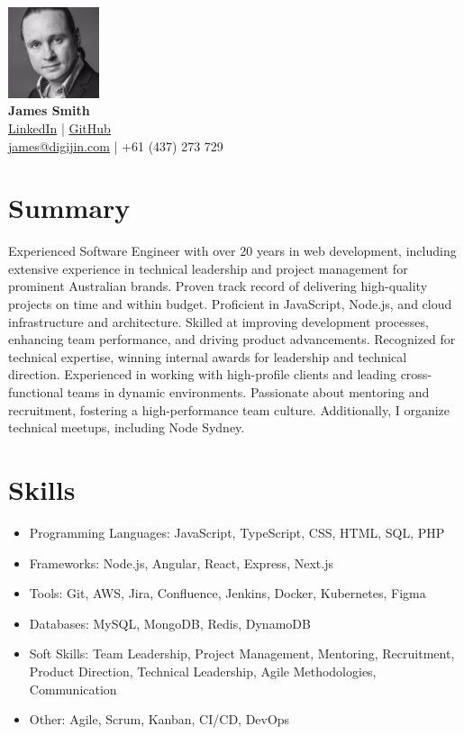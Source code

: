 \documentclass[a4paper,10pt]{article}
\begin{document}
\begin{center}
    \includegraphics[width=0.2\textwidth]{src/profile.jpg} \\ %
    {\Huge \textbf{James Smith}} \\
    \href{https://www.linkedin.com/in/digijin/}{LinkedIn} | \href{https://github.com/digijin}{GitHub} \\
    \href{mailto:james@digijin.com}{james@digijin.com} | +61 (437) 273 729
\end{center}

\section*{Summary}
Experienced Software Engineer with over 20 years in web development, including extensive experience in technical leadership and project management for prominent Australian brands. Proven track record of delivering high-quality projects on time and within budget. Proficient in JavaScript, Node.js, and cloud infrastructure and architecture. Skilled at improving development processes, enhancing team performance, and driving product advancements. Recognized for technical expertise, winning internal awards for leadership and technical direction. Experienced in working with high-profile clients and leading cross-functional teams in dynamic environments. Passionate about mentoring and recruitment, fostering a high-performance team culture. Additionally, I organize technical meetups, including Node Sydney.

\section*{Skills}
\begin{itemize}
    \item Programming Languages: JavaScript, TypeScript, CSS, HTML, SQL, PHP
    \item Frameworks: Node.js, Angular, React, Express, Next.js
    \item Tools: Git, AWS, Jira, Confluence, Jenkins, Docker, Kubernetes, Figma
    \item Databases: MySQL, MongoDB, Redis, DynamoDB
    \item Soft Skills: Team Leadership, Project Management, Mentoring, Recruitment, Product Direction, Technical Leadership, Agile Methodologies, Communication
    \item Other: Agile, Scrum, Kanban, CI/CD, DevOps
\end{itemize}
\end{document}
